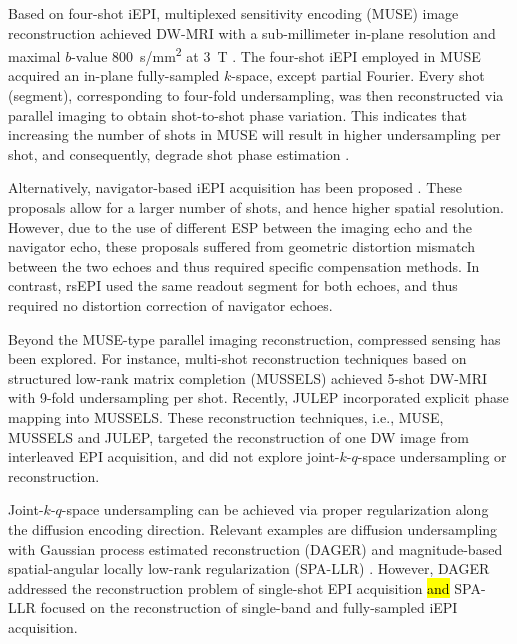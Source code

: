 \documentclass[preprint,12pt,authoryear,review]{elsarticle}
\begin{document}
    Based on four-shot iEPI,
    multiplexed sensitivity encoding (MUSE) image reconstruction
    achieved DW-MRI with a sub-millimeter in-plane resolution
    and maximal $b$-value \SI{800}{s/mm^2} at \SI{3}{\tesla}
    \citep{chen_2013_muse}.
    The four-shot iEPI employed in MUSE acquired
    an in-plane fully-sampled $k$-space, except partial Fourier.
    Every shot (segment), corresponding to four-fold undersampling,
    was then reconstructed via parallel imaging
    to obtain shot-to-shot phase variation.
    This indicates that increasing the number of shots in MUSE
    will result in higher undersampling per shot,
    and consequently, degrade shot phase estimation \citep{wu_2017_diff}.

    Alternatively, navigator-based iEPI acquisition has been proposed
    \citep{jeong_2013_navims,dai_2017_navi,dai_2018_navi}.
    These proposals allow for a larger number of shots,
    and hence higher spatial resolution.
    However, due to the use of different ESP
    between the imaging echo and the navigator echo,
    these proposals suffered from geometric distortion mismatch
    between the two echoes and thus required specific compensation methods.
    In contrast, rsEPI \citep{porter_2009_resolve,heidemann_2010_resolve7t}
    used the same readout segment for both echoes,
    and thus required no distortion correction of navigator echoes.

    Beyond the MUSE-type parallel imaging reconstruction,
    compressed sensing \citep{lustig_2007_cs,block_2007_cs}
    has been explored.
    For instance, multi-shot reconstruction techniques
    based on structured low-rank matrix completion (MUSSELS)
    \citep{mani_2017_mussels,bilgic_2019_neatr} achieved
    5-shot DW-MRI with 9-fold undersampling per shot.
    Recently, JULEP \citep{dai_2023_julep}
    incorporated explicit phase mapping into MUSSELS.
    These reconstruction techniques, i.e., MUSE, MUSSELS and JULEP,
    targeted the reconstruction of one DW image
    from interleaved EPI acquisition,
    and did not explore joint-$k$-$q$-space undersampling or reconstruction.

    Joint-$k$-$q$-space undersampling can be achieved
    via proper regularization along the diffusion encoding direction.
    Relevant examples are diffusion undersampling
    with Gaussian process estimated reconstruction (DAGER)
    \citep{wu_2019_dager} and
    magnitude-based spatial-angular locally low-rank regularization
    (SPA-LLR) \citep{hu_2020_spa_llr}.
    However, DAGER addressed the reconstruction problem
    of single-shot EPI acquisition \hl{and} 
    SPA-LLR focused on the reconstruction
    of single-band and fully-sampled iEPI acquisition.
\end{document}
